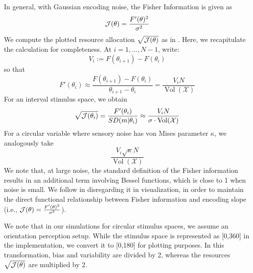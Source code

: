 In general, with Gaussian encoding noise, the Fisher Information is given as
\begin{equation}
    \mathcal{J}(\theta) = \frac{F'(\theta)^2}{\sigma^2}
\end{equation}
We compute the plotted resource allocation $\sqrt{\mathcal{J}(\theta)}$ as in \cite{hahn2024unifying}. Here, we recapitulate the calculation for completeness.
At $i=1, \dots, N-1$, write:
\begin{equation}
    V_i := F(\theta_{i+1}) - F(\theta_{i})
\end{equation}
so that
\begin{equation}
    F'(\theta_i) \approx \frac{F(\theta_{i+1}) - F(\theta_i)}{\theta_{i+1}-\theta_i} = \frac{V_i N}{\operatorname{Vol}(\mathcal{X})}
\end{equation}
For an interval stimulus space, we obtain
\begin{equation}
    \sqrt{\mathcal{J}(\theta_i)} = \frac{F'(\theta_i)}{SD(m|\theta_i)} \approx \frac{V_i N}{\sigma \cdot \operatorname{Vol}(\mathcal{X})}
\end{equation}
For a circular variable where sensory noise has von Mises parameter $\kappa$, we analogously take
\begin{equation}
    \frac{V_i \sqrt{\kappa} N}{\operatorname{Vol}(\mathcal{X})}
\end{equation}
We note that, at large noise, the standard definition of the Fisher information results in an additional term involving Bessel functions, which is close to 1 when noise is small. We follow \cite{hahn2024unifying} in disregarding it in visualization, in order to maintain the direct functional relationship between Fisher information and encoding slope (i.e., $\mathcal{J}(\theta) = \frac{F'(\theta)^2}{\sigma^2}$).

We note that in our simulations for circular stimulus spaces, we assume an orientation perception setup. While the stimulus space is represented as [0,360] in the implementation, we convert it to [0,180] for plotting purposes. In this transformation, bias and variability are divided by 2, whereas the resources $\sqrt{\mathcal{J}(\theta)}$ are multiplied by 2.

